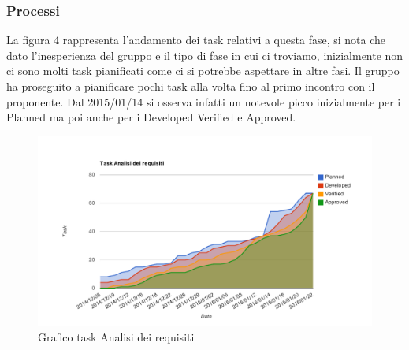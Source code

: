 		\subsubsection{Processi}
		La figura 4 rappresenta l'andamento dei task relativi a questa fase, si nota che dato l'inesperienza del gruppo e il tipo di fase in cui ci troviamo, inizialmente non ci sono molti task pianificati come ci si potrebbe aspettare in altre fasi. Il gruppo ha proseguito a pianificare pochi task alla volta fino al primo incontro con il proponente. Dal 2015/01/14 si osserva infatti un notevole picco inizialmente per i Planned ma poi anche per i Developed Verified e Approved. 
			\begin{figure}[htbp]
				\centering
				\centerline{\includegraphics[scale=1]{images/Grafico_fase_2.pdf}}
				\caption{Grafico task Analisi dei requisiti}
				\label{fig:taskfase2}
			\end{figure}
